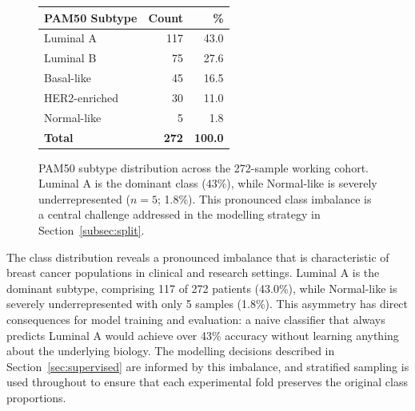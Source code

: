 \begin{figure}[!ht]
    \centering
    \begin{minipage}{0.46\textwidth}
        \centering
        \label{tab:pam50-distribution}
        \begin{tabular}{lrr}
            \hline
            \textbf{PAM50 Subtype} & \textbf{Count} & \textbf{\%} \\
            \hline
            Luminal A     & 117 & 43.0 \\
            Luminal B     &  75 & 27.6 \\
            Basal-like    &  45 & 16.5 \\
            HER2-enriched &  30 & 11.0 \\
            Normal-like   &   5 &  1.8 \\
            \hline
            \textbf{Total} & \textbf{272} & \textbf{100.0} \\
            \hline
        \end{tabular}
    \end{minipage}
    \hfill
    \begin{minipage}{0.50\textwidth}
        \centering
    \end{minipage}
    \caption{PAM50 subtype distribution across the 272-sample working cohort.
    Luminal A is the dominant class (43\%), while Normal-like is severely
    underrepresented ($n = 5$; 1.8\%). This pronounced class imbalance is a
    central challenge addressed in the modelling strategy in
    Section~\ref{subsec:split}.}
    \label{fig:pam50-pie}
\end{figure}

The class distribution reveals a pronounced imbalance that is characteristic
of breast cancer populations in clinical and research settings. Luminal A is
the dominant subtype, comprising 117 of 272 patients (43.0\%), while
Normal-like is severely underrepresented with only 5 samples (1.8\%). This
asymmetry has direct consequences for model training and evaluation: a naive
classifier that always predicts Luminal A would achieve over 43\% accuracy
without learning anything about the underlying biology. The modelling decisions
described in Section~\ref{sec:supervised} are informed by this imbalance, and
stratified sampling is used throughout to ensure that each experimental fold
preserves the original class proportions.


